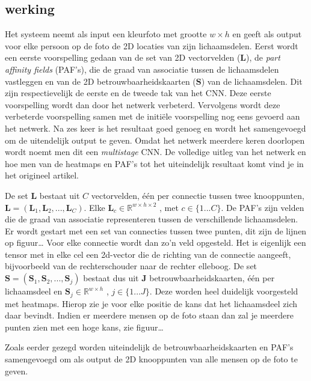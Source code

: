 \documentclass[a4paper,twoside,kulak]{kulakreport}
\begin{document}
\subsection{werking}

Het systeem neemt als input een kleurfoto met grootte $w \times h$ en geeft als output voor elke persoon op de foto de 2D locaties van zijn lichaamsdelen. Eerst wordt een eerste voorspelling gedaan van de set van 2D vectorvelden ($\textbf{L}$), de \textit{part affinity fields} (PAF's), die de graad van associatie tussen de lichaamsdelen vastleggen en van de 2D betrouwbaarheidskaarten ($\textbf{S}$) van de lichaamsdelen. Dit zijn respectievelijk de eerste en de tweede tak van het CNN. Deze eerste voorspelling wordt dan door het netwerk verbeterd. Vervolgens wordt deze verbeterde voorspelling samen met de initiële voorspelling nog eens gevoerd aan het netwerk. Na zes keer is het resultaat goed genoeg en wordt het samengevoegd om de uitendelijk output te geven. Omdat het netwerk meerdere keren doorlopen wordt noemt men dit een \textit{multistage} CNN. De volledige uitleg van het netwerk en hoe men van de heatmaps en PAF's tot het uiteindelijk resultaat komt vind je in het origineel artikel.

De set \textbf{L} bestaat uit $C$ vectorvelden, één per connectie tussen twee knooppunten, $\textbf{L} = (\textbf{L}_1,\textbf{L}_2,...,\textbf{L}_C)$. Elke $\textbf{L}_c \in \mathbb{R}^{w \times h \times 2}$ , met $c \in \{1...C\}.$ De PAF’s  zijn velden die de graad van associatie representeren tussen de verschillende lichaamsdelen. Er wordt gestart met een set van connecties tussen twee punten, dit zijn de lijnen op figuur… Voor elke connectie wordt dan zo’n veld opgesteld. Het is eigenlijk een tensor met in elke cel een 2d-vector die de richting van de connectie aangeeft, bijvoorbeeld van de rechterschouder naar de rechter elleboog.
De set $\textbf{S} = (\textbf{S}_1,\textbf{S}_2,...,\textbf{S}_j)$ bestaat dus uit $\textbf{J}$ betrouwbaarheidskaarten, één per lichaamsdeel en $\textbf{S}_j \in \mathbb{R} ^{w \times h}$ , $j \in \{1...J\}$.
Deze worden heel duidelijk voorgesteld met heatmaps. Hierop zie je voor elke positie de kans dat het lichaamsdeel zich daar bevindt. Indien er meerdere mensen op de foto staan  dan zal je meerdere punten zien met een hoge kans, zie figuur…

Zoals eerder gezegd worden uiteindelijk de betrouwbaarheidskaarten en PAF's samengevoegd om als output de 2D knooppunten van alle mensen op de foto te geven.
\end{document}
